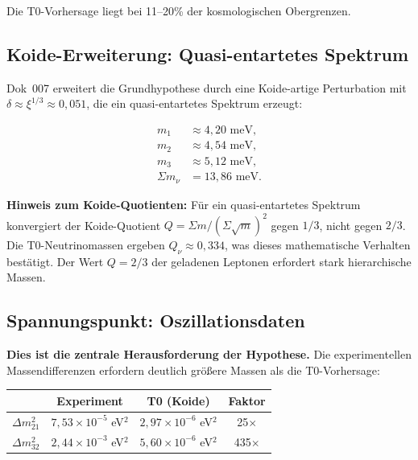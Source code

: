 	Die T0-Vorhersage liegt bei 11--20\% der kosmologischen Obergrenzen.
	
	\subsection*{Koide-Erweiterung: Quasi-entartetes Spektrum}
	
	Dok~007 erweitert die Grundhypothese durch eine Koide-artige Perturbation mit \(\delta \approx \xi^{1/3} \approx 0{,}051\), die ein quasi-entartetes Spektrum erzeugt:
	
\begin{equation}
	\begin{aligned}
		m_1 &\approx 4{,}20\text{ meV}, \\
		m_2 &\approx 4{,}54\text{ meV}, \\
		m_3 &\approx 5{,}12\text{ meV}, \\
		\Sigma m_\nu &= 13{,}86\text{ meV.}
	\end{aligned}
\end{equation}
	
	\textbf{Hinweis zum Koide-Quotienten:} Für ein quasi-entartetes Spektrum konvergiert der Koide-Quotient \(Q = \Sigma m / (\Sigma\sqrt{m})^2\) gegen \(1/3\), nicht gegen \(2/3\). Die T0-Neutrinomassen ergeben \(Q_\nu \approx 0{,}334\), was dieses mathematische Verhalten bestätigt. Der Wert \(Q = 2/3\) der geladenen Leptonen erfordert stark hierarchische Massen.
	
	\subsection*{Spannungspunkt: Oszillationsdaten}
	
	\textbf{Dies ist die zentrale Herausforderung der Hypothese.} Die experimentellen Massendifferenzen erfordern deutlich größere Massen als die T0-Vorhersage:
	
	\begin{center}
		\small
		\begin{tabular}{lccc}
			& \textbf{Experiment} & \textbf{T0 (Koide)} & \textbf{Faktor} \\
			\hline
			\(\Delta m^2_{21}\) & \(7{,}53 \times 10^{-5}\) eV\(^2\) & \(2{,}97 \times 10^{-6}\) eV\(^2\) & 25\(\times\) \\
			\(\Delta m^2_{32}\) & \(2{,}44 \times 10^{-3}\) eV\(^2\) & \(5{,}60 \times 10^{-6}\) eV\(^2\) & 435\(\times\) \\
		\end{tabular}
	\end{center}
	
